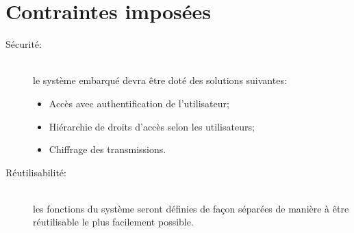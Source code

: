 
\section{Contraintes imposées}

    \begin{description}
        \item [Sécurité:]\hfill\\
             le système embarqué devra être doté des
            solutions suivantes:
            \begin{itemize}
                \item Accès avec authentification de l'utilisateur;
                \item Hiérarchie de droits d'accès selon les
                    utilisateurs;
                \item Chiffrage des transmissions.
            \end{itemize}
        \item [Réutilisabilité:]\hfill\\
            les fonctions du système seront définies
            de façon séparées de manière à être réutilisable le plus
            facilement possible.
    \end{description}
